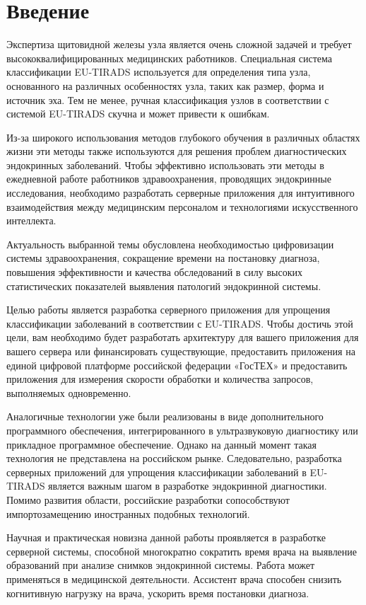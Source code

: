 \chapter*{Введение}
\label{sec:afterwords}

Экспертиза щитовидной железы узла является очень сложной задачей и требует высококвалифицированных медицинских работников. Специальная система классификации EU-TIRADS используется для определения типа узла, основанного на различных особенностях узла, таких как размер, форма и источник эха. Тем не менее, ручная классификация узлов в соответствии с системой EU-TIRADS скучна и может привести к ошибкам.


Из-за широкого использования методов глубокого обучения в различных областях жизни эти методы также используются для решения проблем диагностических эндокринных заболеваний. Чтобы эффективно использовать эти методы в ежедневной работе работников здравоохранения, проводящих эндокринные исследования, необходимо разработать серверные приложения для интуитивного взаимодействия между медицинским персоналом и технологиями искусственного интеллекта.


Актуальность выбранной темы обусловлена необходимостью цифровизации системы здравоохранения, сокращение времени на постановку диагноза, повышения эффективности и качества обследований в силу высоких статистических показателей выявления патологий эндокринной системы.


Целью работы является разработка серверного приложения для упрощения классификации заболеваний в соответствии с EU-TIRADS. Чтобы достичь этой цели, вам необходимо будет разработать архитектуру для вашего приложения для вашего сервера или финансировать существующие, предоставить приложения на единой цифровой платформе российской федерации «ГосТЕХ» и предоставить приложения для измерения скорости обработки и количества запросов, выполняемых одновременно.


Аналогичные технологии уже были реализованы в виде дополнительного программного обеспечения, интегрированного в ультразвуковую диагностику или прикладное программное обеспечение. Однако на данный момент такая технология не представлена ​​на российском рынке. Следовательно, разработка серверных приложений для упрощения классификации заболеваний в EU-TIRADS является важным шагом в разработке эндокринной диагностики. Помимо развития области, российские разработки сопособствуют импортозамещению иностранных подобных технологий.


Научная и практическая новизна данной работы проявляется в разработке серверной системы, способной многократно сократить время врача на выявление образований при анализе снимков эндокринной системы.
Работа может применяться в медицинской деятельности. Ассистент врача способен снизить когнитивную нагрузку на врача, ускорить время постановки диагноза.

